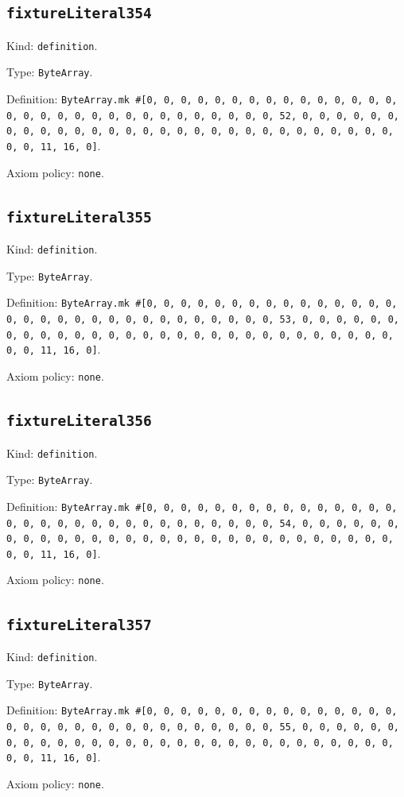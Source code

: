 \documentclass[11pt]{article}
\begin{document}
\subsection*{\texttt{fixtureLiteral354}}
\noindent Kind: \texttt{definition}.\par
\noindent Type: \texttt{ByteArray}.\par
\noindent Definition: \texttt{ByteArray.mk \#[0, 0, 0, 0, 0, 0, 0, 0, 0, 0, 0, 0, 0, 0, 0, 0, 0, 0, 0, 0, 0, 0, 0, 0, 0, 0, 0, 0, 0, 0, 0, 52, 0, 0, 0, 0, 0, 0, 0, 0, 0, 0, 0, 0, 0, 0, 0, 0, 0, 0, 0, 0, 0, 0, 0, 0, 0, 0, 0, 0, 0, 0, 0, 11, 16, 0]}.\par
\noindent Axiom policy: \texttt{none}.\par
\subsection*{\texttt{fixtureLiteral355}}
\noindent Kind: \texttt{definition}.\par
\noindent Type: \texttt{ByteArray}.\par
\noindent Definition: \texttt{ByteArray.mk \#[0, 0, 0, 0, 0, 0, 0, 0, 0, 0, 0, 0, 0, 0, 0, 0, 0, 0, 0, 0, 0, 0, 0, 0, 0, 0, 0, 0, 0, 0, 0, 53, 0, 0, 0, 0, 0, 0, 0, 0, 0, 0, 0, 0, 0, 0, 0, 0, 0, 0, 0, 0, 0, 0, 0, 0, 0, 0, 0, 0, 0, 0, 0, 11, 16, 0]}.\par
\noindent Axiom policy: \texttt{none}.\par
\subsection*{\texttt{fixtureLiteral356}}
\noindent Kind: \texttt{definition}.\par
\noindent Type: \texttt{ByteArray}.\par
\noindent Definition: \texttt{ByteArray.mk \#[0, 0, 0, 0, 0, 0, 0, 0, 0, 0, 0, 0, 0, 0, 0, 0, 0, 0, 0, 0, 0, 0, 0, 0, 0, 0, 0, 0, 0, 0, 0, 54, 0, 0, 0, 0, 0, 0, 0, 0, 0, 0, 0, 0, 0, 0, 0, 0, 0, 0, 0, 0, 0, 0, 0, 0, 0, 0, 0, 0, 0, 0, 0, 11, 16, 0]}.\par
\noindent Axiom policy: \texttt{none}.\par
\subsection*{\texttt{fixtureLiteral357}}
\noindent Kind: \texttt{definition}.\par
\noindent Type: \texttt{ByteArray}.\par
\noindent Definition: \texttt{ByteArray.mk \#[0, 0, 0, 0, 0, 0, 0, 0, 0, 0, 0, 0, 0, 0, 0, 0, 0, 0, 0, 0, 0, 0, 0, 0, 0, 0, 0, 0, 0, 0, 0, 55, 0, 0, 0, 0, 0, 0, 0, 0, 0, 0, 0, 0, 0, 0, 0, 0, 0, 0, 0, 0, 0, 0, 0, 0, 0, 0, 0, 0, 0, 0, 0, 11, 16, 0]}.\par
\noindent Axiom policy: \texttt{none}.\par
\end{document}
